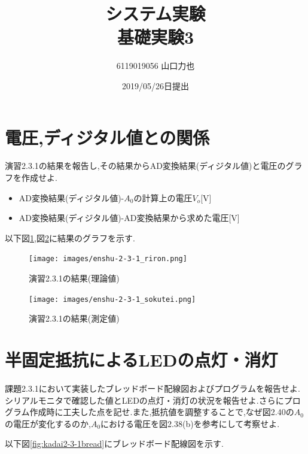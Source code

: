 \documentclass{jarticle}
\title{{システム実験}\\基礎実験3}
\author{6119019056 山口力也}
\date{2019/05/26日提出}
\begin{document}
\maketitle
\section{電圧,ディジタル値との関係}
演習2.3.1の結果を報告し,その結果からAD変換結果(ディジタル値)と電圧のグラフを作成せよ.
\begin{itemize}

\item AD変換結果(ディジタル値)-$A_0$の計算上の電圧$V_o$[V]
\item AD変換結果(ディジタル値)-AD変換結果から求めた電圧[V]

\end{itemize}

以下図\ref{fig:enshu2-3-1riron},図\ref{fig:enshu2-3-1sokutei}に結果のグラフを示す.

\begin{figure}[H]
\begin{center}
\texttt{[image: images/enshu-2-3-1\_riron.png]}
\caption{演習2.3.1の結果(理論値)}
\label{fig:enshu2-3-1riron}
\end{center}
\end{figure}

\begin{figure}[H]
\begin{center}
\texttt{[image: images/enshu-2-3-1\_sokutei.png]}
\caption{演習2.3.1の結果(測定値)}
\label{fig:enshu2-3-1sokutei}
\end{center}
\end{figure}


\section{半固定抵抗によるLEDの点灯・消灯}
課題2.3.1において実装したブレッドボード配線図およびプログラムを報告せよ.シリアルモニタで確認した値とLEDの点灯・消灯の状況を報告せよ.さらにプログラム作成時に工夫した点を記せ.また,抵抗値を調整することで,なぜ図2.40の$A_0$の電圧が変化するのか,$A_0$における電圧を図2.38(b)を参考にして考察せよ.

以下図\ref{fig:kadai2-3-1bread}にブレッドボード配線図を示す.
\end{document}
